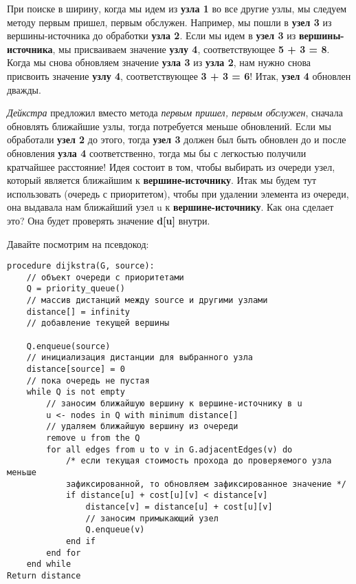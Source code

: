 \vspace{\baselineskip}
При поиске в ширину, когда мы идем из \textbf{узла 1} во все другие узлы, мы следуем методу первым пришел, первым обслужен. Например, мы пошли в \textbf{узел 3} из вершины-источника до обработки \textbf{узла 2}. Если мы идем в \textbf{узел 3} из \textbf{вершины-источника}, мы присваиваем значение \textbf{узлу 4}, соответствующее \textbf{5 + 3 = 8}. Когда мы снова обновляем значение\textbf{ узла 3} из \textbf{узла 2}, нам нужно снова присвоить значение \textbf{узлу 4}, соответствующее \textbf{3 + 3 = 6}! Итак, \textbf{узел 4} обновлен дважды.

\vspace{\baselineskip}
\textit{Дейкстра }предложил вместо метода \textit{первым пришел, первым обслужен}, сначала обновлять ближайшие узлы, тогда потребуется меньше обновлений. Если мы обработали \textbf{узел 2} до этого, тогда\textbf{ узел 3} должен был быть обновлен до и после обновления \textbf{узла 4} соответственно, тогда мы бы с легкостью получили кратчайшее расстояние! Идея состоит в том, чтобы выбирать из очереди узел, который является ближайшим к\textbf{ вершине-источнику}. Итак мы будем тут использовать (очередь с приоритетом), чтобы при удалении элемента из очереди, она выдавала нам ближайший узел u к \textbf{вершине-источнику}. Как она сделает это? Она будет проверять значение \textbf{d[u]} внутри.

\vspace{\baselineskip}
Давайте посмотрим на псевдокод:

\vspace{\baselineskip}
\begin{tcolorbox}
\begin{verbatim} 
procedure dijkstra(G, source):
	// объект очереди с приоритетами
	Q = priority_queue()
	// массив дистанций между source и другими узлами
	distance[] = infinity
	// добавление текущей вершины

	Q.enqueue(source)
	// инициализация дистанции для выбранного узла 
	distance[source] = 0
	// пока очередь не пустая 
	while Q is not empty
		// заносим ближайшую вершину к вершине-источнику в u 
		u <- nodes in Q with minimum distance[]
		// удаляем ближайшую вершину из очереди
		remove u from the Q
		for all edges from u to v in G.adjacentEdges(v) do
			/* если текущая стоимость прохода до проверяемого узла меньше
			зафиксированной, то обновляем зафиксированное значение */
			if distance[u] + cost[u][v] < distance[v]
				distance[v] = distance[u] + cost[u][v]
				// заносим примыкающий узел
				Q.enqueue(v)
			end if
		end for
	end while
Return distance
\end{verbatim}
\end{tcolorbox}


